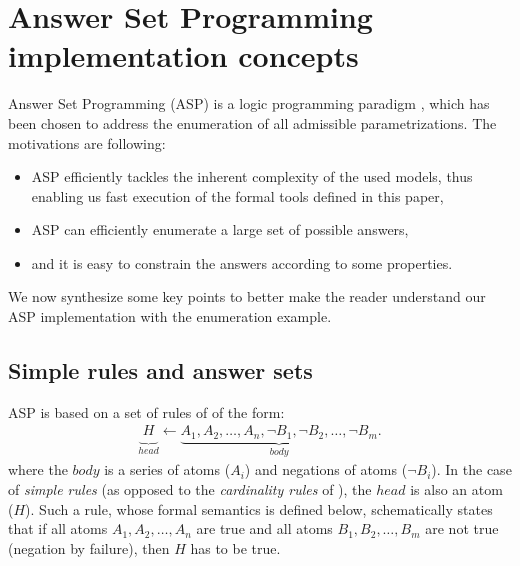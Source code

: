 \section{Answer Set Programming implementation concepts}\label{sec:impl}

\newcommand{\atom}[1]{#1}
\newcommand{\predicate}[1]{\mathit{#1}}
\newcommand{\la}{\leftarrow}
\newcommand{\var}[1]{#1}
\newcommand{\nota}{\neg}

\newcommand{\paramlabel}{\predicate{param\_label}}
\newcommand{\paramres}{\predicate{param\_resource}}
\newcommand{\component}{\predicate{component}}
\newcommand{\componentlevels}{\predicate{component\_levels}}
\newcommand{\param}{\predicate{param}}
\newcommand{\inferedparam}{\predicate{infered\_param}}
\newcommand{\lessactive}{\predicate{less\_active}}
\newcommand{\paraminf}{\predicate{param\_inf}}



Answer Set Programming (ASP) is a logic programming paradigm \cite{Baral03, Baral10},
which has been chosen to address the enumeration of all admissible parametrizations.
The motivations are following:
\begin{itemize}
  \item ASP efficiently tackles the inherent complexity of the used models, thus enabling us fast execution of the formal tools defined in this paper,
  \item ASP can efficiently enumerate a large set of possible answers,
  \item and it is easy to constrain the answers according to some properties.
\end{itemize}
We now synthesize some key points to better make the reader understand our ASP implementation with the enumeration example.



\subsection{Simple rules and answer sets}\label{sssec:simple_rules}
ASP is based on a set of rules of of the form:
\begin{align*}
  \underbrace{{\ }\atom{H}_{\ }}_{head} \la \underbrace{\atom{A}_1, \atom{A}_2, \dots, \atom{A}_n, \nota \atom{B}_1, \nota \atom{B}_2, \dots, \nota \atom{B}_m}_{body}.
\end{align*}
where the $body$ is a series of atoms ($\atom{A}_i$) and negations of atoms ($\nota \atom{B}_i$).
In the case of \emph{simple rules} (as opposed to the \emph{cardinality rules} of ), the $head$ is also an atom ($\atom{H}$).
Such a rule, whose formal semantics is defined below,
schematically states that if all atoms $\atom{A}_1, \atom{A}_2, \dots, \atom{A}_n$ are true
and all atoms $\atom{B}_1, \atom{B}_2, \dots, \atom{B}_m$ are not true (negation by failure), then $\atom{H}$ has to be true.

